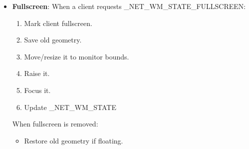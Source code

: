 \documentclass{report}
\begin{document}
\begin{itemize}
\begin{enumerate}
            \end{enumerate}
            The active window property is read-only from the client’s perspective; clients request activation by sending a \_NET\_ACTIVE\_WINDOW client message to the root, and the WM may accept or refuse it.
            \bigbreak \noindent 
            Client-window properties/messages to support:
            \begin{enumerate}
                \item \textbf{\_NET\_WM\_NAME}:	UTF-8 title
                \item \textbf{\_NET\_WM\_WINDOW\_TYPE}:	normal/dialog/dock/utility/etc.
                \item \textbf{\_NET\_WM\_STATE}:	fullscreen, sticky, above, demands attention
                \item \textbf{\_NET\_WM\_DESKTOP}:	workspace assignment
                \item \textbf{\_NET\_WM\_PID}:	process ID, useful for diagnostics
                \item \textbf{\_NET\_ACTIVE\_WINDOW}:	focus request
                \item \textbf{\_NET\_CLOSE\_WINDOW}:	polite close request
                \item \textbf{\_NET\_WM\_STATE\_FULLSCREEN:}	fullscreen behavior
            \end{enumerate}
            For a tiling WM, \_NET\_WM\_STATE\_FULLSCREEN is the most important modern state. A fullscreen window should usually cover the monitor work area or full monitor area, be above tiled windows, and suppress normal tiling while active.
        \item \textbf{Fullscreen}: When a client requests \_NET\_WM\_STATE\_FULLSCREEN:
            \begin{enumerate}
                \item Mark client fullscreen.
                \item Save old geometry.
                \item Move/resize it to monitor bounds.
                \item Raise it.
                \item Focus it.
                \item Update \_NET\_WM\_STATE
            \end{enumerate}
            When fullscreen is removed:
            \begin{itemize}
                \item Restore old geometry if floating.

\end{itemize}
\end{itemize}
\end{document}
